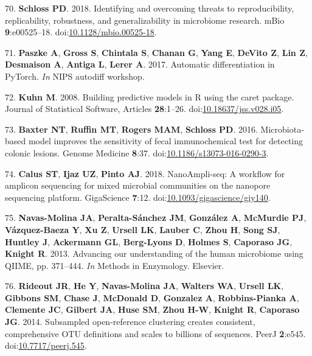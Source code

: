 \documentclass[11pt,]{article}
\begin{document}
\leavevmode\hypertarget{ref-Schloss2018b}{}%
70. \textbf{Schloss PD}. 2018. Identifying and overcoming threats to
reproducibility, replicability, robustness, and generalizability in
microbiome research. mBio \textbf{9}:e00525--18.
doi:\href{https://doi.org/10.1128/mbio.00525-18}{10.1128/mbio.00525-18}.

\leavevmode\hypertarget{ref-Paszke2017}{}%
71. \textbf{Paszke A}, \textbf{Gross S}, \textbf{Chintala S},
\textbf{Chanan G}, \textbf{Yang E}, \textbf{DeVito Z}, \textbf{Lin Z},
\textbf{Desmaison A}, \textbf{Antiga L}, \textbf{Lerer A}. 2017.
Automatic differentiation in PyTorch. \emph{In} NIPS autodiff workshop.

\leavevmode\hypertarget{ref-Kuhn2008}{}%
72. \textbf{Kuhn M}. 2008. Building predictive models in R using the
caret package. Journal of Statistical Software, Articles
\textbf{28}:1--26.
doi:\href{https://doi.org/10.18637/jss.v028.i05}{10.18637/jss.v028.i05}.

\leavevmode\hypertarget{ref-Baxter2016}{}%
73. \textbf{Baxter NT}, \textbf{Ruffin MT}, \textbf{Rogers MAM},
\textbf{Schloss PD}. 2016. Microbiota-based model improves the
sensitivity of fecal immunochemical test for detecting colonic lesions.
Genome Medicine \textbf{8}:37.
doi:\href{https://doi.org/10.1186/s13073-016-0290-3}{10.1186/s13073-016-0290-3}.

\leavevmode\hypertarget{ref-Calus2018}{}%
74. \textbf{Calus ST}, \textbf{Ijaz UZ}, \textbf{Pinto AJ}. 2018.
NanoAmpli-seq: A workflow for amplicon sequencing for mixed microbial
communities on the nanopore sequencing platform. GigaScience
\textbf{7}:12.
doi:\href{https://doi.org/10.1093/gigascience/giy140}{10.1093/gigascience/giy140}.

\leavevmode\hypertarget{ref-NavasMolina2013}{}%
75. \textbf{Navas-Molina JA}, \textbf{Peralta-Sánchez JM},
\textbf{González A}, \textbf{McMurdie PJ}, \textbf{Vázquez-Baeza Y},
\textbf{Xu Z}, \textbf{Ursell LK}, \textbf{Lauber C}, \textbf{Zhou H},
\textbf{Song SJ}, \textbf{Huntley J}, \textbf{Ackermann GL},
\textbf{Berg-Lyons D}, \textbf{Holmes S}, \textbf{Caporaso JG},
\textbf{Knight R}. 2013. Advancing our understanding of the human
microbiome using QIIME, pp. 371--444. \emph{In} Methods in Enzymology.
Elsevier.

\leavevmode\hypertarget{ref-Rideout2014}{}%
76. \textbf{Rideout JR}, \textbf{He Y}, \textbf{Navas-Molina JA},
\textbf{Walters WA}, \textbf{Ursell LK}, \textbf{Gibbons SM},
\textbf{Chase J}, \textbf{McDonald D}, \textbf{Gonzalez A},
\textbf{Robbins-Pianka A}, \textbf{Clemente JC}, \textbf{Gilbert JA},
\textbf{Huse SM}, \textbf{Zhou H-W}, \textbf{Knight R}, \textbf{Caporaso
JG}. 2014. Subsampled open-reference clustering creates consistent,
comprehensive OTU definitions and scales to billions of sequences. PeerJ
\textbf{2}:e545.
doi:\href{https://doi.org/10.7717/peerj.545}{10.7717/peerj.545}.
\end{document}
